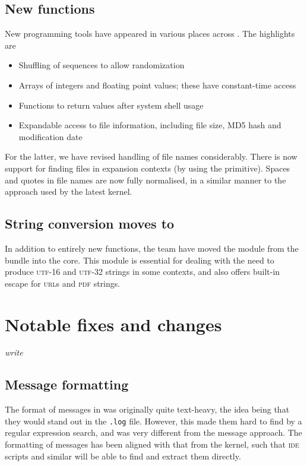 \documentclass{ltnews}
\begin{document}
\subsection{New functions}

New programming tools have appeared in various places across .
The highlights are
\begin{itemize}
  \item Shuffling of sequences to allow randomization
  \item Arrays of integers and floating point values; these have constant-time
    access
  \item Functions to return values after system shell usage
  \item Expandable access to file information, including file size, MD5
    hash and modification date
\end{itemize}

For the latter, we have revised handling of file names considerably. There is
now support for finding files in expansion contexts (by using the
 primitive). Spaces and quotes in file names are now fully
normalised, in a similar manner to the approach used by the latest \LaTeXe{}
kernel.

\subsection{String conversion moves to }

In addition to entirely new functions, the team have moved the
 module from the  bundle into the
 core. This module is essential for dealing with the need to produce
\textsc{utf}-16 and \textsc{utf}-32 strings in some contexts, and also offers
built-in escape for \textsc{url}s and \textsc{pdf} strings.

\section{Notable fixes and changes}

\emph{write}

\subsection{Message formatting}

The format of messages in  was originally quite text-heavy, the idea
being that they would stand out in the \texttt{.log} file. However, this made
them hard to find by a regular expression search, and was very different from
the \LaTeXe{} message approach. The formatting of  messages has been
aligned with that from the \LaTeXe{} kernel, such that \textsc{ide} scripts and
similar will be able to find and extract them directly.
\end{document}
